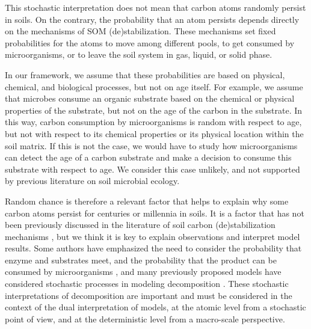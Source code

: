 \documentclass[draft,linenumbers]{agujournal}
\begin{document}
This stochastic interpretation does not mean that carbon atoms randomly persist in soils. On the contrary, the probability that an atom persists depends directly on the mechanisms of SOM (de)stabilization. These mechanisms set fixed probabilities for the atoms to move among different pools, to get consumed by microorganisms, or to leave the soil system in gas, liquid, or solid phase. 

In our framework, we assume that these probabilities are based on physical, chemical, and biological processes, but not on age itself. For example, we assume that microbes consume an organic substrate based on the chemical or physical properties of the substrate, but not on the age of the carbon in the substrate. In this way, carbon consumption by microorganisms is random with respect to age, but not with respect to its chemical properties or its physical location within the soil matrix.  If this is not the case, we would have to study how microorganisms can detect the age of a carbon substrate and make a decision to consume this substrate with respect to age. We consider this case unlikely, and not supported by previous literature on soil microbial ecology.

Random chance is therefore a relevant factor that helps to explain why some carbon atoms persist for centuries or millennia in soils. It is a factor that has not been previously discussed in the literature of soil carbon (de)stabilization mechanisms \citep{Schmidt2011, Dungait2012, LehmannKleber}, but we think it is key to explain observations and interpret model results. Some authors have emphasized the need to consider the probability that enzyme and substrates meet, and the probability that the product can be consumed by microorganisms \citep{Don2013, Gleixner2013, Spohn2014}, and many previously proposed models have considered stochastic processes in modeling decomposition \citep{Manzoni2009SBB}. These stochastic interpretations of decomposition are important and must be considered in the context of the dual interpretation of models, at the atomic level from a stochastic point of view, and at the deterministic level from a macro-scale perspective. 
\end{document}
